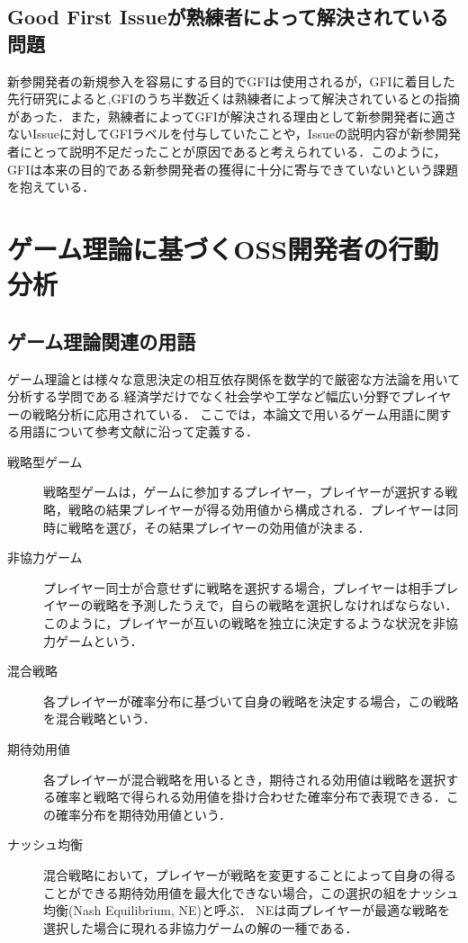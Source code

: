 \documentclass[11pt]{jreport}
\begin{document}
\subsection{Good First Issueが熟練者によって解決されている問題}
新参開発者の新規参入を容易にする目的でGFIは使用されるが，GFIに着目した先行研究\cite{GFI_half}によると,GFIのうち半数近くは熟練者によって解決されているとの指摘があった．また，熟練者によってGFIが解決される理由として新参開発者に適さないIssueに対してGFIラベルを付与していたことや，Issueの説明内容が新参開発者にとって説明不足だったことが原因であると考えられている．このように，GFIは本来の目的である新参開発者の獲得に十分に寄与できていないという課題を抱えている．

\section{ゲーム理論に基づくOSS開発者の行動分析 }

\subsection{ゲーム理論関連の用語 }

ゲーム理論とは様々な意思決定の相互依存関係を数学的で厳密な方法論を用いて分析する学問である.経済学だけでなく社会学や工学など幅広い分野でプレイヤーの戦略分析に応用されている．
ここでは，本論文で用いるゲーム用語に関する用語について参考文献\cite{game_theory}に沿って定義する．

\begin{description}
\item[戦略型ゲーム] 戦略型ゲームは，ゲームに参加するプレイヤー，プレイヤーが選択する戦略，戦略の結果プレイヤーが得る効用値から構成される．プレイヤーは同時に戦略を選び，その結果プレイヤーの効用値が決まる．
\item[非協力ゲーム] プレイヤー同士が合意せずに戦略を選択する場合，プレイヤーは相手プレイヤーの戦略を予測したうえで，自らの戦略を選択しなければならない．このように，プレイヤーが互いの戦略を独立に決定するような状況を非協力ゲームという．
\item[混合戦略]各プレイヤーが確率分布に基づいて自身の戦略を決定する場合，この戦略を混合戦略という．
\item[期待効用値]各プレイヤーが混合戦略を用いるとき，期待される効用値は戦略を選択する確率と戦略で得られる効用値を掛け合わせた確率分布で表現できる．この確率分布を期待効用値という． 
\item[ナッシュ均衡]混合戦略において，プレイヤーが戦略を変更することによって自身の得ることができる期待効用値を最大化できない場合，この選択の組をナッシュ均衡(Nash Equilibrium, NE)と呼ぶ． NEは両プレイヤーが最適な戦略を選択した場合に現れる非協力ゲームの解の一種である．
\item[] 
\end{description}
\end{document}
